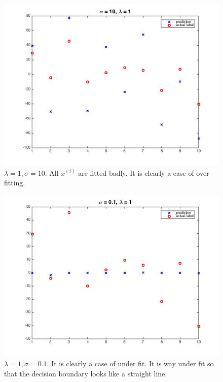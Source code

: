 \documentclass[twoside]{article}
\theoremstyle{definition}
\theoremstyle{definition}
\theoremstyle{remark}
\begin{document}
\begin{figure}[H]
\centering
\includegraphics[width=120mm]{problem1Pic4.jpg}
\caption{ $\lambda =1, \sigma = 10$.  All $x^{(i)}$ are fitted badly. It is clearly a case of over fitting.  \label{problem1Pic2}}
\end{figure}

\begin{figure}[H]
\centering
\includegraphics[width=120mm]{problem1Pic5.jpg}
\caption{ $\lambda =1, \sigma = 0.1$.  It is clearly a case of under fit. It is way under fit so that the decision boundary looks like a straight line.  \label{problem1Pic2}}
\end{figure}
\end{document}
